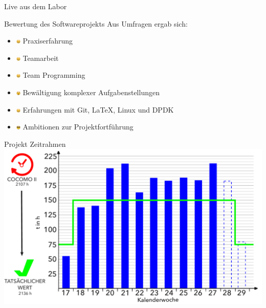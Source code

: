\documentclass{beamer}
\begin{document}
\begin{frame}[plain]
    \center
    Live aus dem Labor
\end{frame}

\begin{frame}{Bewertung des Softwareprojekts}
    Aus Umfragen ergab sich:
    \begin{itemize} \pause
        \item \includegraphics[width=8px]{1F600.pdf} Praxiserfahrung \pause
        \item \includegraphics[width=8px]{1F600.pdf} Teamarbeit \pause
        \item \includegraphics[width=8px]{1F600.pdf} Team Programming \pause
        \item \includegraphics[width=8px]{1F635.pdf} Bewältigung komplexer Aufgabenstellungen \pause
        \item \includegraphics[width=8px]{1F600.pdf} Erfahrungen mit Git, \LaTeX, Linux und DPDK \pause
        \item \includegraphics[width=8px]{1F60E.pdf} Ambitionen zur Projektfortführung
    \end{itemize}
\end{frame}

\begin{frame}{Projekt Zeitrahmen}
    \includegraphics[width=\linewidth]{AufwandsschaetzungNeu.pdf}
\end{frame}
\end{document}

